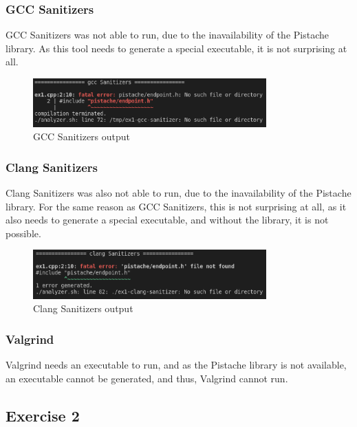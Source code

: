 \documentclass{article}
\begin{document}
\subsubsection{GCC Sanitizers}

GCC Sanitizers was not able to run, due to the inavailability of the Pistache library. As this tool needs to generate a special executable, it is not surprising at all.

\begin{figure}[ht!]
    \centering
    \includegraphics[width=0.8\textwidth]{images/ex1/gccSanitizers.png}
    \caption{GCC Sanitizers output}\label{fig:ex1/gccSanitizers}
\end{figure}

\subsubsection{Clang Sanitizers}

Clang Sanitizers was also not able to run, due to the inavailability of the Pistache library. For the same reason as GCC Sanitizers, this is not surprising at all, as it also needs to generate a special executable, and without the library, it is not possible.

\begin{figure}[ht!]
    \centering
    \includegraphics[width=0.8\textwidth]{images/ex1/clangSanitizers.png}
    \caption{Clang Sanitizers output}\label{fig:ex1/clangSanitizers}
\end{figure}

\subsubsection{Valgrind}

Valgrind needs an executable to run, and as the Pistache library is not available, an executable cannot be generated, and thus, Valgrind cannot run.

\subsection{Exercise 2}
\end{document}
